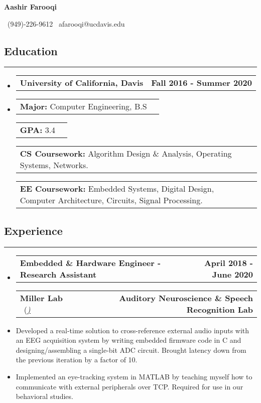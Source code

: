 \documentclass[10pt,letterpaper]{article}
\makeatletter
\newcommand{\items}[2]
{
	\begin{tabular*}{\linewidth}{l @{\extracolsep{\fill}} r}
		#1 & #2 \\
	\end{tabular*}
}
\newcommand{\header}[2]
{
	\begin{tabular*}{\linewidth}{l @{\extracolsep{\fill}} r}
		\hspace{-27pt} #1 & #2 \\
	\end{tabular*}
}
\newcommand{\sectionbreak}
{
	\vspace{-1.2em}
	\rule{\textwidth}{1.7pt}
	\vspace{-1.7em}
}
\makeatother
\begin{document}
\begin{center}
{\LARGE \textbf{Aashir Farooqi}}

\vspace{0.5em}
\ (949)-226-9612 \textbar 
\ afarooqi@ucdavis.edu\textbar
\ \href{https://github.com/AashPointO}{\emph{\underline{}}}
\\
\end{center}
\vspace{-20pt}


\subsection*{Education}
\sectionbreak

\begin{itemize}

\item[] 
	\header
		{\textbf{University of California, Davis}}
		{\textbf{Fall 2016 - Summer 2020}}
\item[]
	\vspace{-2.5pt}
	\items
		{\textbf{Major:} Computer Engineering, B.S}
		{}
	\items
		{\textbf{GPA:} 3.4}
		{}
	\items
		{\textbf{CS Coursework:} Algorithm Design \& Analysis, Operating Systems, Networks.}
		{}
	\items
		{\textbf{EE Coursework:} Embedded Systems, Digital Design, Computer Architecture, Circuits, Signal Processing.}
		{}
{\vspace{-0.6em}}
	
\end{itemize}

\vspace{-24.65pt}

\subsection*{Experience}
\sectionbreak

\begin{itemize}
	\item[]
		\header
			{\textbf{Embedded \& Hardware Engineer - Research Assistant}} 
			{\textbf{April 2018 - June 2020}}
		\header
		{\textbf{Miller Lab} \ (\href{https://millerlab.faculty.ucdavis.edu}{\small \emph{\underline{\smash{millerlab.faculty.ucdavis.edu})}}} }
			{\textbf{Auditory Neuroscience \& Speech Recognition Lab}} 
		\item
			Developed a real-time solution to cross-reference external audio inputs with an EEG acquisition system
			by writing embedded firmware code in C and designing/assembling a single-bit ADC circuit. Brought latency down from the previous iteration by a factor of 10.
		\item 
			Implemented an eye-tracking system in MATLAB by teaching myself how to communicate with external peripherals over TCP. Required for use in our
			behavioral studies.
\end{itemize}
\end{document}

